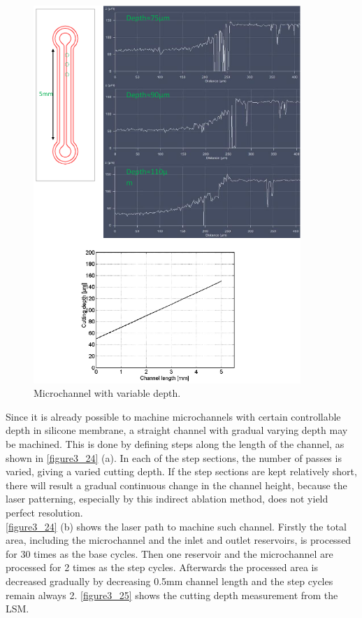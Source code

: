 \begin{figure}[!b]%
\centering
\includegraphics[width=0.9\textwidth]{figures/designandfabrication/figure3_25}%
\caption{Microchannel with variable depth.}%
\label{figure3_25}%
\end{figure}

Since it is already possible to machine microchannels with certain controllable depth in silicone membrane, a straight channel with gradual varying depth may be machined. This is done by defining steps along the length of the channel, as shown in \autoref{figure3_24} (a). In each of the step sections, the number of passes is varied, giving a varied cutting depth. If the step sections are kept relatively short, there will result a gradual continuous change in the channel height, because the laser patterning, especially by this indirect ablation method, does not yield perfect resolution.\\


\autoref{figure3_24} (b) shows the laser path to machine such channel. Firstly the total area, including the microchannel and the inlet and outlet reservoirs, is processed for 30 times as the base cycles. Then one reservoir and the microchannel are processed for 2 times as the step cycles. Afterwards the processed area is decreased gradually by decreasing 0.5mm channel length and the step cycles remain always 2. \autoref{figure3_25} shows the cutting depth measurement from the LSM.\\ 


